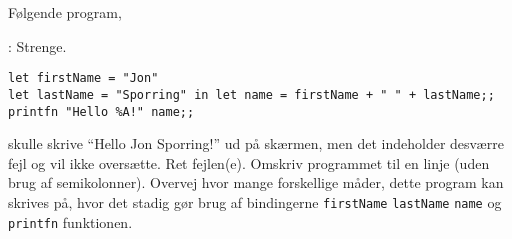 Følgende program,
  \begin{codeNOutput}{: Strenge.}
\begin{lstlisting}
let firstName = "Jon"
let lastName = "Sporring" in let name = firstName + " " + lastName;;
printfn "Hello %A!" name;;
\end{lstlisting}
\end{codeNOutput}
skulle skrive ``Hello Jon Sporring!'' ud på skærmen, men det indeholder desværre fejl og vil ikke oversætte. Ret fejlen(e). Omskriv programmet til en linje (uden brug af semikolonner). Overvej hvor mange forskellige måder, dette program kan skrives på, hvor det stadig gør brug af bindingerne \lstinline!firstName! \lstinline!lastName! \lstinline!name! og \lstinline!printfn! funktionen. 
